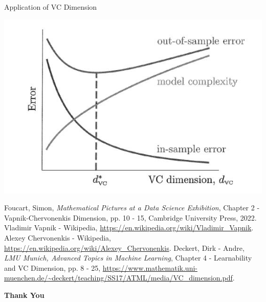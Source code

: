 \documentclass{beamer}
\begin{document}
\begin{frame}{Application of VC Dimension}
\begin{center}
    \includegraphics[scale=0.7]{figures/Capture10.JPG}\\
    \caption{\footnotesize Fig 1. Behavior of VC dimension with respect to error}
\end{center}
\end{frame}

\begin{thebibliography}{10}
 Foucart, Simon, \emph{Mathematical Pictures at a Data Science Exhibition}, Chapter 2 - Vapnik-Chervonenkis Dimension, pp. 10 - 15, Cambridge University Press, 2022.
 Vladimir Vapnik - Wikipedia, \url{https://en.wikipedia.org/wiki/Vladimir_Vapnik}.
 Alexey Chervonenkis - Wikipedia, \url{https://en.wikipedia.org/wiki/Alexey_Chervonenkis}.
 Deckert, Dirk - Andre, \emph{LMU Munich, Advanced Topics in Machine Learning}, Chapter 4 - Learnability and VC Dimension, pp. 8 - 25, \url{https://www.mathematik.uni-muenchen.de/~deckert/teaching/SS17/ATML/media/VC_dimension.pdf}.
\end{thebibliography}

\begin{frame}{}
\begin{center}
    \textbf{\huge Thank You}
\end{center}
\end{frame}
\end{document}
